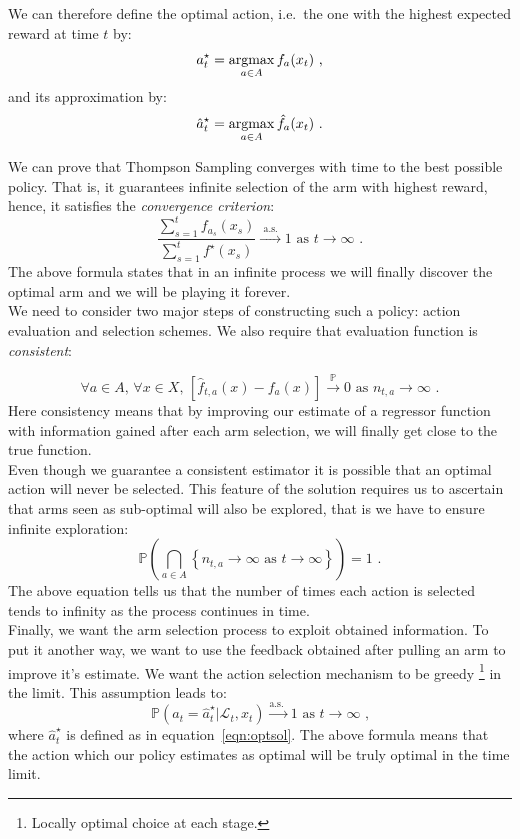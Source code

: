 \documentclass[12pt, a4paper, pdflatex, leqno, twoside]{report}
\newcommand{\argmax}{\operatornamewithlimits{argmax}}
\begin{document}
We can therefore define the optimal action, i.e.\ the one with the highest expected reward at 
time $t$ by:
\begin{equation}
  a_t^\star = \argmax_{a \in A} f_a (x_t) \text{ ,}
\end{equation}
and its approximation by:
\begin{equation}
  \label{eqn:optsol} \hat{a}_t^\star = \argmax_{a \in A} \hat{f}_a (x_t) \text{ 
.}
\end{equation}

We can prove that Thompson Sampling converges with time to the best possible 
policy. That is, it guarantees infinite selection of the arm with highest reward, hence, it satisfies the \emph{convergence 
criterion}:
\begin{equation}
  \label{eqn:convg}
  \frac
    {\sum_{s=1}^t f_{a_s} (x_s)}
    {\sum_{s=1}^t f^\star (x_s)}
  \xrightarrow{\text{ a.s.\ }} 1 \text{ as } t \rightarrow \infty \text{ .}
\end{equation}
The above formula states that in an infinite process we will finally discover the 
optimal arm and we will be playing it forever.\\


We need to consider two major steps of constructing such a policy: action 
evaluation and selection schemes. We also require that evaluation function is 
\emph{consistent}:

$$
  \forall a \in A \text{, } \forall x \in X \text{, } \left[ \hat{f}_{t, a}(x) -
 f_a(x) \right] \xrightarrow{\mathbb{P}} 0 \text{ as } n_{t,a} \rightarrow 
\infty \text{ .}
$$
Here consistency means that by improving our estimate of a regressor function with information gained after each arm selection, we will finally get close to 
the true function.\\

Even though we guarantee a consistent estimator it is possible that an optimal 
action will never be selected. This feature of the solution requires us to ascertain
that arms seen as sub-optimal will also be explored, that is we have to ensure 
infinite exploration:
$$
  \mathbb{P} \left( \bigcap_{a \in A} \left\{ n_{t,a} \rightarrow \infty \text{ 
as } t \rightarrow \infty \right\} \right) = 1 \text{ .}
$$
The above equation tells us that the number of times each action is selected 
tends to infinity as the process continues in time.\\ 

Finally, we want the arm selection process to exploit obtained 
information.  To put it another way, we want to use the feedback obtained after pulling an arm to improve it's estimate. We want the action selection mechanism to be greedy \footnote{Locally optimal choice at each 
stage.} in the limit. This assumption leads to:
$$
  \mathbb{P} \left( a_t = \hat{a}_t^\star | \mathscr{L}_t, x_t \right) 
\xrightarrow{\text{a.s.\ }} 1 \text{ as } t \rightarrow \infty \text{ ,}
$$
where $\hat{a}_t^\star$ is defined as in equation~\ref{eqn:optsol}. The above 
formula means that the action which our policy estimates as optimal will be 
truly optimal in the time limit.\\
\end{document}
